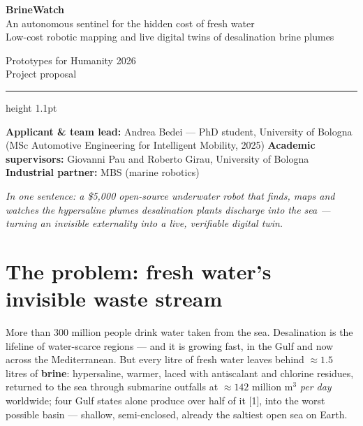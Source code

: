 \documentclass[10pt,a4paper]{article}
\newcommand{\keyword}[1]{\textbf{\color{deepblue}#1}}
\begin{document}
\begin{minipage}[b]{0.72\textwidth}
  {\sffamily\bfseries\fontsize{23}{25}\selectfont\color{deepblue} BrineWatch}\\[3pt]
  {\sffamily\large An autonomous sentinel for the hidden cost of fresh water}\\[2pt]
  {\sffamily\small\color{black!60} Low-cost robotic mapping and live digital twins of desalination brine plumes}
\end{minipage}\hfill
\begin{minipage}[b]{0.26\textwidth}\raggedleft
  {\sffamily\small\color{black!60} Prototypes for Humanity 2026\\ Project proposal}
\end{minipage}

\vspace{3pt}
{\color{deepblue}\hrule height 1.1pt}
\vspace{4pt}

{\small\sffamily \textbf{Applicant \& team lead:} Andrea Bedei --- PhD student, University of Bologna (MSc Automotive Engineering for Intelligent Mobility, 2025) \;\textperiodcentered\; \textbf{Academic supervisors:} Giovanni Pau and Roberto Girau, University of Bologna \;\textperiodcentered\; \textbf{Industrial partner:} MBS (marine robotics)}

\vspace{2pt}
{\itshape\color{deepblue} In one sentence: a \$5{,}000 open-source underwater robot that finds, maps and watches the hypersaline plumes desalination plants discharge into the sea --- turning an invisible externality into a live, verifiable digital twin.}

\section{The problem: fresh water's invisible waste stream}
More than 300 million people drink water taken from the sea. Desalination is the lifeline of water-scarce regions --- and it is growing fast, in the Gulf and now across the Mediterranean. But every litre of fresh water leaves behind ${\approx}1.5$ litres of \keyword{brine}: hypersaline, warmer, laced with antiscalant and chlorine residues, returned to the sea through submarine outfalls at ${\approx}142$ million $\mathrm{m}^3$ \emph{per day} worldwide; four Gulf states alone produce over half of it [1], into the worst possible basin --- shallow, semi-enclosed, already the saltiest open sea on Earth.
\end{document}
